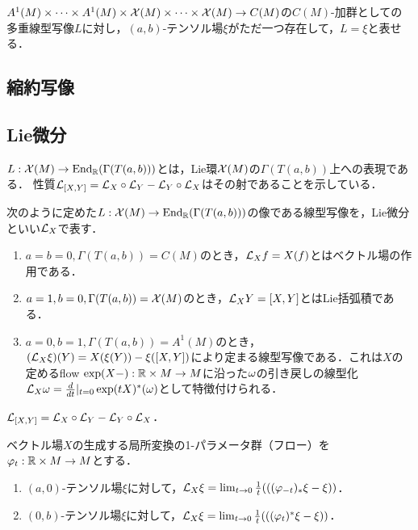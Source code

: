 \documentclass[uplatex,dvipdfmx]{jsreport}
\begin{document}
\begin{theorem}
    $A^1(M)\times\cdots\times A^1(M)\times\mathcal{X}(M)\times\cdots\times\mathcal{X}(M)\to C(M)$の$C(M)$-加群としての多重線型写像$L$に対し，$(a,b)$-テンソル場$\xi$がただ一つ存在して，$L=\xi$と表せる．
\end{theorem}

\subsection{縮約写像}

\subsection{Lie微分}

\begin{tcolorbox}[colframe=ForestGreen, colback=ForestGreen!10!white,breakable,colbacktitle=ForestGreen!40!white,coltitle=black,fonttitle=\bfseries\sffamily,
title=]
    $L:\mathcal{X}(M)\to\mathrm{End}_{\mathbb{R}}(\Gamma(T(a,b)))$とは，Lie環$\mathcal{X}(M)$の$\Gamma(T(a,b))$上への表現である．
    性質$\mathcal{L}_{[X,Y]}=\mathcal{L}_X\circ\mathcal{L}_Y-\mathcal{L}_Y\circ\mathcal{L}_X$はその射であることを示している．
\end{tcolorbox}

\begin{definition}
    次のように定めた$L:\mathcal{X}(M)\to\mathrm{End}_{\mathbb{R}}(\Gamma(T(a,b)))$の像である線型写像を，Lie微分といい$\mathcal{L}_X$で表す．
    \begin{enumerate}
        \item $a=b=0,\Gamma(T(a,b))=C(M)$のとき，$\mathcal{L}_Xf=X(f)$とはベクトル場の作用である．
        \item $a=1,b=0,\Gamma(T(a,b))=\mathcal{X}(M)$のとき，$\mathcal{L}_XY=[X,Y]$とはLie括弧積である．
        \item $a=0,b=1,\Gamma(T(a,b))=A^1(M)$のとき，$(\mathcal{L}_X\xi)(Y)=X(\xi(Y))-\xi([X,Y])$により定まる線型写像である．これは$X$の定めるflow $\exp(X-):\mathbb{R}\times M\to M$に沿った$\omega$の引き戻しの線型化$\mathcal{L}_X\omega=\frac{d }{d t}|_{t=0}\exp(tX)^*(\omega)$として特徴付けられる．
    \end{enumerate}
\end{definition}

\begin{lemma}
    $\mathcal{L}_{[X,Y]}=\mathcal{L}_X\circ\mathcal{L}_Y-\mathcal{L}_Y\circ\mathcal{L}_X$．
\end{lemma}

\begin{theorem}[Lie微分の幾何学的特徴付け]
    ベクトル場$X$の生成する局所変換の1-パラメータ群（フロー）を$\varphi_t:\mathbb{R}\times M\to M$とする．
    \begin{enumerate}
        \item $(a,0)$-テンソル場$\xi$に対して，$\mathcal{L}_X\xi=\lim_{t\to 0}\frac{1}{t}(((\varphi_{-t})_*\xi-\xi))$．
        \item $(0,b)$-テンソル場$\xi$に対して，$\mathcal{L}_X\xi=\lim_{t\to 0}\frac{1}{t}(((\varphi_{t})^*\xi-\xi))$．
    \end{enumerate}
\end{theorem}
\end{document}
